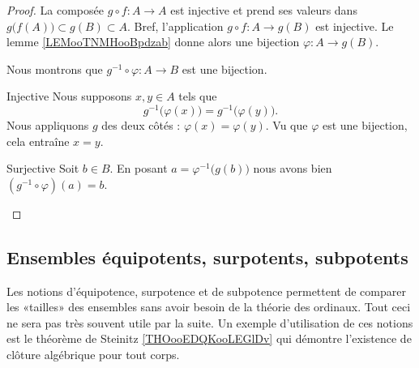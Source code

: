 \begin{proof}
    La composée \( g\circ f\colon A\to A\) est injective et prend ses valeurs dans \( g\big( f(A) \big)\subset g(B)\subset A\). Bref, l'application \( g\circ f\colon A \to g(B)\) est injective. Le lemme \ref{LEMooTNMHooBpdzab} donne alors une bijection \( \varphi\colon A\to g(B)\).

    Nous montrons que \( g^{-1}\circ\varphi\colon A\to B\) est une bijection.

    \begin{subproof}
        \item[Injective]
            Nous supposons \( x,y\in A\) tels que
            \begin{equation}
                g^{-1}\big( \varphi(x) \big)=g^{-1}\big( \varphi(y) \big).
            \end{equation}
            Nous appliquons \( g\) des deux côtés : \( \varphi(x)=\varphi(y)\). Vu que \( \varphi\) est une bijection, cela entraîne \( x=y\).
        \item[Surjective]
            Soit \( b\in B\). En posant \( a=\varphi^{-1}\big( g(b) \big)\) nous avons bien \( (g^{-1}\circ \varphi)(a)=b\).
    \end{subproof}
\end{proof}

\subsection{Ensembles équipotents, surpotents, subpotents}

Les notions d'équipotence, surpotence et de subpotence permettent de comparer les «tailles» des ensembles sans avoir besoin de la théorie des ordinaux. Tout ceci ne sera pas très souvent utile par la suite. Un exemple d'utilisation de ces notions est le théorème de Steinitz \ref{THOooEDQKooLEGlDv} qui démontre l'existence de clôture algébrique pour tout corps.

